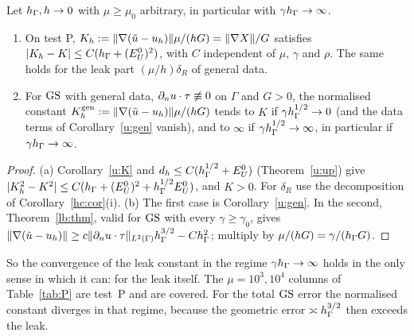\begin{corollary}\label{u:Kall}
Let $h_\Gamma,h\to0$ with $\mu\ge\mu_0$ arbitrary, in particular with $\gamma h_\Gamma\to\infty$.
\begin{enumerate}[label=(\alph*)]
\item On test P, $K_h:=\lVert \nabla(\tilde u-u_h)\rVert\mu/(hG)=\lVert \nabla X\rVert/G$ satisfies $|K_h-K|\le C(h_\Gamma+(E^0_U)^2)$, with $C$ independent of $\mu$, $\gamma$ and $\rho$. The same holds for the leak part $(\mu/h)\delta_R$ of general data.
\item For $\mathrm{GS}$ with general data, $\partial_n u\cdot\tau\not\equiv0$ on $\Gamma$ and $G>0$, the normalised constant $K_h^{\rm gen}:=\lVert \nabla(\tilde u-u_h)\rVert\mu/(hG)$ tends to $K$ if $\gamma h_\Gamma^{1/2}\to0$ (and the data terms of Corollary~\ref{u:gen} vanish), and to $\infty$ if $\gamma h_\Gamma^{1/2}\to\infty$, in particular if $\gamma h_\Gamma\to\infty$.
\end{enumerate}
\end{corollary}

\begin{proof}
(a) Corollary~\ref{u:K} and $d_h\le C(h_\Gamma^{1/2}+E^0_U)$ (Theorem~\ref{u:up}) give $|K_h^2-K^2|\le C(h_\Gamma+(E^0_U)^2+h_\Gamma^{1/2}E^0_U)$, and $K>0$. For $\delta_R$ use the decomposition of Corollary~\ref{hc:cor}(i). (b) The first case is Corollary~\ref{u:gen}. In the second, Theorem~\ref{lb:thm}, valid for $\mathrm{GS}$ with every $\gamma\ge\gamma_0$, gives $\lVert \nabla(\tilde u-u_h)\rVert\ge c\lVert \partial_n u\cdot\tau\rVert_{L^2(\Gamma)}h_\Gamma^{3/2}-Ch_\Gamma^2$; multiply by $\mu/(hG)=\gamma/(h_\Gamma G)$.
\end{proof}

So the convergence of the leak constant in the regime $\gamma h_\Gamma\to\infty$ holds in the only sense in which it can: for the leak itself. The $\mu=10^3,10^4$ columns of Table~\ref{tab:P} are test~P and are covered. For the total $\mathrm{GS}$ error the normalised constant diverges in that regime, because the geometric error $\asymp h_\Gamma^{3/2}$ then exceeds the leak.

